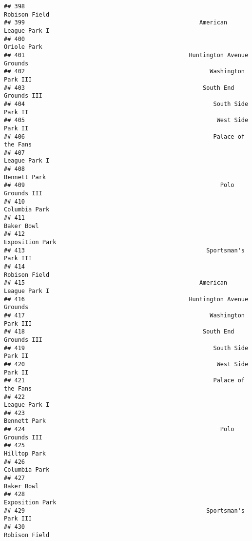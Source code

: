 \documentclass[]{article}
\begin{document}
\begin{verbatim}
## 398                                                           Robison Field
## 399                                                  American League Park I
## 400                                                             Oriole Park
## 401                                               Huntington Avenue Grounds
## 402                                                     Washington Park III
## 403                                                   South End Grounds III
## 404                                                      South Side Park II
## 405                                                       West Side Park II
## 406                                                      Palace of the Fans
## 407                                                           League Park I
## 408                                                            Bennett Park
## 409                                                        Polo Grounds III
## 410                                                           Columbia Park
## 411                                                              Baker Bowl
## 412                                                         Exposition Park
## 413                                                    Sportsman's Park III
## 414                                                           Robison Field
## 415                                                  American League Park I
## 416                                               Huntington Avenue Grounds
## 417                                                     Washington Park III
## 418                                                   South End Grounds III
## 419                                                      South Side Park II
## 420                                                       West Side Park II
## 421                                                      Palace of the Fans
## 422                                                           League Park I
## 423                                                            Bennett Park
## 424                                                        Polo Grounds III
## 425                                                            Hilltop Park
## 426                                                           Columbia Park
## 427                                                              Baker Bowl
## 428                                                         Exposition Park
## 429                                                    Sportsman's Park III
## 430                                                           Robison Field

\end{verbatim}
\end{document}
